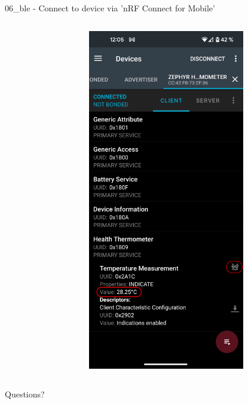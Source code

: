 \documentclass[10pt, aspectratio=169]{beamer}
\begin{document}
\begin{frame}[fragile]{06\_ble - Connect to device via 'nRF Connect for Mobile'}
\begin{columns}[T,onlytextwidth]
\begin{figure}
      \end{figure}
      \begin{figure}
        \includegraphics[width=0.8\textwidth]{images/nrf_connect_ble_connected.png}
      \end{figure}


  \end{columns}

\end{frame}

\begin{frame}[standout]
  Questions?
\end{frame}
\end{document}
